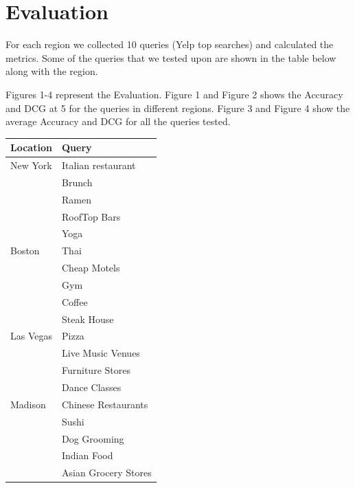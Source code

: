 \documentclass[paper=letter, fontsize=15pt]{article} %
\begin{document}
\section{Evaluation}
For each region we collected 10 queries (Yelp top searches) and calculated the metrics. Some of the queries that we tested upon are shown in the table below along with the region.


Figures 1-4 represent the Evaluation. Figure 1 and Figure 2 shows the Accuracy and DCG at 5 for the queries in different regions.
Figure 3 and Figure 4 show the average Accuracy and DCG for all the queries tested.

\begin{table}[h!]

\centering
\begin{tabular}{|l|l|}
\hline
Location & \textbf{Query} \\ \hline
New York & Italian restaurant \\ \hline
 & Brunch  \\ \hline
 & Ramen  \\ \hline
 & RoofTop Bars  \\ \hline
 & Yoga   \\ \hline
 
 Boston & Thai  \\ \hline
 & Cheap Motels   \\ \hline
 & Gym  \\ \hline
 & Coffee  \\ \hline
& Steak House  \\ \hline

Las Vegas & Pizza  \\ \hline
& Live Music Venues  \\ \hline
& Furniture Stores  \\ \hline
& Dance Classes  \\ \hline

Madison & Chinese Restaurants  \\ \hline
& Sushi  \\ \hline
& Dog Grooming  \\ \hline
& Indian Food  \\ \hline
& Asian Grocery Stores  \\ \hline


\end{tabular}
\end{table}
\end{document}
